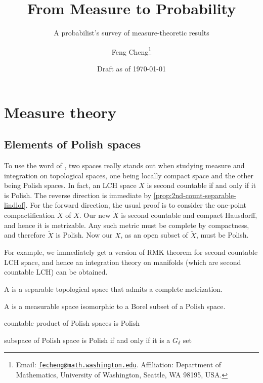 \documentclass[10pt]{book}
\title{From Measure to Probability}
\subtitle{A probabilist's survey of measure-theoretic results}
\author{Feng Cheng\thanks{Email: \href{mailto:fecheng@uw.edu}{\texttt{fecheng@math.washington.edu}}. Affiliation: Department of Mathematics, University of Washington, Seattle, WA 98195, USA.}}
\date{Draft as of \today}
\begin{document}
\maketitle

\cleardoublepage
{}
\tableofcontents




\part{Measure theory}





% 
\chapter{Elements of Polish spaces}

To use the word of , two spaces really stands out when studying measure and integration on topological spaces, one being locally compact space and the other being Polish spaces. In fact, an LCH space $X$ is second countable if and only if it is Polish. The reverse direction is immediate by \cref{prop:2nd-count-separable-lindlof}. For the forward direction, the usual proof is to consider the one-point compactification $\widetilde{X}$ of $X$. Our new $\widetilde{X}$ is second countable and compact Hausdorff, and hence it is metrizable. Any such metric must be complete by compactness, and therefore $\widetilde{X}$ is Polish. Now our $X$, as an open subset of $\widetilde{X}$, must be Polish.

For example, we immediately get a version of RMK theorem for second countable LCH space, and hence an integration theory on manifolds (which are second countable LCH) can be obtained.

\begin{defn}
    A  is a separable topological space that admits a complete metrization.
    
    A  is a measurable space isomorphic to a Borel subset of a Polish space.
\end{defn}

countable product of Polish spaces is Polish

subspace of Polish space is Polish if and only if it is a $G_\delta$ set
\end{document}
